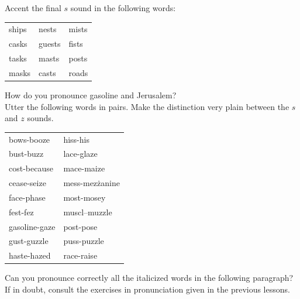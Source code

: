 \documentclass[10pt]{article}
\begin{document}
Accent the final $s$ sound in the following words:

\begin{center}
\begin{tabular}{lll}
ships & nests & mists \\
casks & guests & fists \\
tasks & masts & posts \\
masks & casts & roads \\
\end{tabular}
\end{center}

How do you pronounce gasoline and Jerusalem?\\
Utter the following words in pairs. Make the distinction very plain between the $s$ and $z$ sounds.

\begin{center}
\begin{tabular}{ll}
bows-booze & hiss-his \\
bust-buzz & lace-glaze \\
cost-because & mace-maize \\
cease-seize & mess-mezżanine \\
face-phase & most-mosey \\
fest-fez & muscl--muzzle \\
gasoline-gaze & post-pose \\
gust-guzzle & puss-puzzle \\
haste-hazed & race-raise \\
\end{tabular}
\end{center}

Can you pronounce correctly all the italicized words in the following paragraph? If in doubt, consult the exercises in pronunciation given in the previous lessons.
\end{document}
